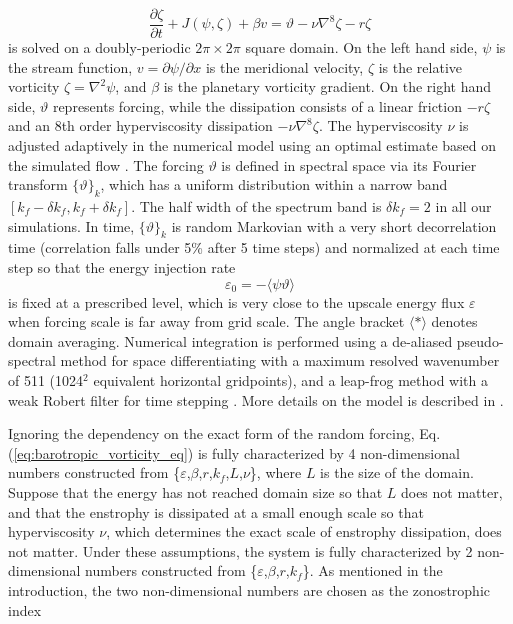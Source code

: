\documentclass{ametsoc}
\begin{document}
\begin{equation}
\frac{\partial\zeta}{\partial t}+J(\psi,\zeta)+\beta v=\vartheta-\nu\nabla^{8}\zeta-r\zeta\label{eq:barotropic_vorticity_eq}
\end{equation}
is solved on a doubly-periodic $2\pi\times2\pi$ square domain. On
the left hand side, $\psi$ is the stream function, $v=\partial\psi/\partial x$
is the meridional velocity, $\zeta$ is the relative vorticity $\zeta=\nabla^{2}\psi$,
and $\beta$ is the planetary vorticity gradient. On the right hand
side, $\vartheta$ represents forcing, while the dissipation consists
of a linear friction $-r\zeta$ and an 8th order hyperviscosity dissipation
$-\nu\nabla^{8}\zeta$. The hyperviscosity $\nu$ is adjusted adaptively
in the numerical model using an optimal estimate based on the simulated
flow \citep{Maltrud1991,Smith2002}. The forcing $\vartheta$ is defined
in spectral space via its Fourier transform $\{\vartheta\}_{k}$,
which has a uniform distribution within a narrow band $[k_{f}-\delta k_{f},k_{f}+\delta k_{f}]$.
The half width of the spectrum band is $\delta k_{f}=2$ in all our
simulations. In time, $\{\vartheta\}_{k}$ is random Markovian with
a very short decorrelation time (correlation falls under 5\% after
5 time steps) and normalized at each time step so that the energy
injection rate
\begin{equation}
\varepsilon_{0}=-\langle\psi\vartheta\rangle\label{eq:energy_injection_rate}
\end{equation}
is fixed at a prescribed level, which is very close to the upscale
energy flux $\varepsilon$ when forcing scale is far away from grid
scale. The angle bracket $\langle*\rangle$ denotes domain averaging.
Numerical integration is performed using a de-aliased pseudo-spectral
method for space differentiating with a maximum resolved wavenumber
of 511 (1024$^{2}$ equivalent horizontal gridpoints), and a leap-frog
method with a weak Robert filter for time stepping \citep{Patterson1971}.
More details on the model is described in \citet{Smith2002}.

Ignoring the dependency on the exact form of the random forcing, Eq.
(\ref{eq:barotropic_vorticity_eq}) is fully characterized by 4 non-dimensional
numbers constructed from \{$\varepsilon$,$\beta$,$r$,$k_{f}$,$L$,$\nu$\},
where $L$ is the size of the domain. Suppose that the energy has
not reached domain size so that $L$ does not matter, and that the
enstrophy is dissipated at a small enough scale so that hyperviscosity
$\nu$, which determines the exact scale of enstrophy dissipation,
does not matter. Under these assumptions, the system is fully characterized
by 2 non-dimensional numbers constructed from \{$\varepsilon$,$\beta$,$r$,$k_{f}$\}.
As mentioned in the introduction, the two non-dimensional numbers
are chosen as the zonostrophic index 
\end{document}
